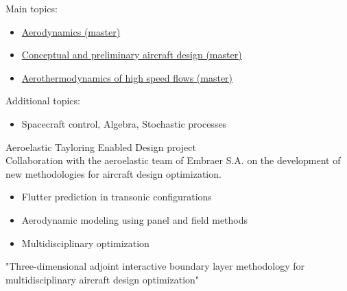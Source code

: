 \documentclass[10pt,a4paper,ragged2e,withhyper]{altacv}
\begin{document}
\begin{paracol}{2}


Main topics:
\begin{itemize}
\item \href{https://www.programmes.uliege.be/cocoon/20232024/cours/AERO0001-1.html}{Aerodynamics (master)}
\item \href{https://www.programmes.uliege.be/cocoon/20232024/cours/APRI0004-1.html}{Conceptual and preliminary aircraft design (master)}
\item \href{https://www.programmes.uliege.be/cocoon/20232024/cours/AERO0033-1.html}{Aerothermodynamics of high speed flows (master)}
\end{itemize}
\medskip
Additional topics:
\begin{itemize}
\item Spacecraft control, Algebra, Stochastic processes
\end{itemize}

\divider

\textcolor{myRed}{Aeroelastic Tayloring Enabled Design project}\\
\medskip
Collaboration with the aeroelastic team of Embraer S.A. on the development of new methodologies for aircraft design optimization.\\
\medskip
\begin{itemize}
  \item Flutter prediction in transonic configurations
  \item Aerodynamic modeling using panel and field methods
  \item Multidisciplinary optimization
\end{itemize}

\medskip


\textcolor{myRed}{"Three-dimensional adjoint interactive boundary layer methodology for multidisciplinary aircraft design optimization"}


\end{paracol}
\end{document}
